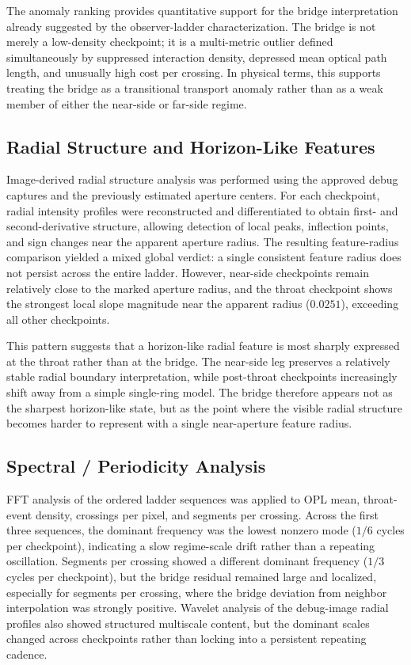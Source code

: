 \documentclass[11pt]{article}
\begin{document}
The anomaly ranking provides quantitative support for the bridge interpretation already suggested by the observer-ladder characterization. The bridge is not merely a low-density checkpoint; it is a multi-metric outlier defined simultaneously by suppressed interaction density, depressed mean optical path length, and unusually high cost per crossing. In physical terms, this supports treating the bridge as a transitional transport anomaly rather than as a weak member of either the near-side or far-side regime.

\subsection{Radial Structure and Horizon-Like Features}

Image-derived radial structure analysis was performed using the approved debug captures and the previously estimated aperture centers. For each checkpoint, radial intensity profiles were reconstructed and differentiated to obtain first- and second-derivative structure, allowing detection of local peaks, inflection points, and sign changes near the apparent aperture radius. The resulting feature-radius comparison yielded a mixed global verdict: a single consistent feature radius does not persist across the entire ladder. However, near-side checkpoints remain relatively close to the marked aperture radius, and the throat checkpoint shows the strongest local slope magnitude near the apparent radius ($0.0251$), exceeding all other checkpoints.

This pattern suggests that a horizon-like radial feature is most sharply expressed at the throat rather than at the bridge. The near-side leg preserves a relatively stable radial boundary interpretation, while post-throat checkpoints increasingly shift away from a simple single-ring model. The bridge therefore appears not as the sharpest horizon-like state, but as the point where the visible radial structure becomes harder to represent with a single near-aperture feature radius.

\subsection{Spectral / Periodicity Analysis}

FFT analysis of the ordered ladder sequences was applied to OPL mean, throat-event density, crossings per pixel, and segments per crossing. Across the first three sequences, the dominant frequency was the lowest nonzero mode ($1/6$ cycles per checkpoint), indicating a slow regime-scale drift rather than a repeating oscillation. Segments per crossing showed a different dominant frequency ($1/3$ cycles per checkpoint), but the bridge residual remained large and localized, especially for segments per crossing, where the bridge deviation from neighbor interpolation was strongly positive. Wavelet analysis of the debug-image radial profiles also showed structured multiscale content, but the dominant scales changed across checkpoints rather than locking into a persistent repeating cadence.
\end{document}
